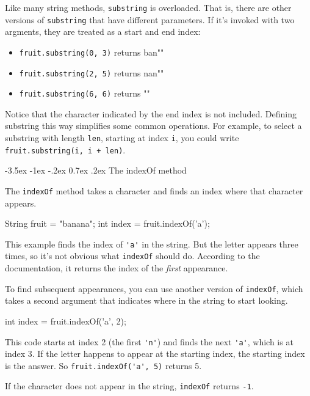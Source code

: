 \documentclass[12pt]{book}
\makeatletter
\theoremstyle{exercise}
\newcommand{\java}[1]{\verb"#1"}
\renewcommand{\section}{\@startsection{section}{1}{\z@}%
    {-3.5ex \@plus -1ex \@minus -.2ex}%
    {0.7ex \@plus.2ex}%
    {\normalfont\Large\bfseries}}
\newcommand{\java}[1]{\lstinline{#1}} %
\makeatother
\begin{document}
Like many string methods, \java{substring} is overloaded.
That is, there are other versions of \java{substring} that have different parameters.
If it's invoked with two argments, they are treated as a start and end index:

\begin{itemize}
\item \java{fruit.substring(0, 3)} returns \java{"ban"}
\item \java{fruit.substring(2, 5)} returns \java{"nan"}
\item \java{fruit.substring(6, 6)} returns \java{""}
\end{itemize}

Notice that the character indicated by the end index is not included.
Defining substring this way simplifies some common operations.
For example, to select a substring with length \java{len}, starting at index \java{i}, you could write \java{fruit.substring(i, i + len)}.


\section{The indexOf method}

The \java{indexOf} method takes a character and finds an index where that character appears.

\begin{code}
    String fruit = "banana";
    int index = fruit.indexOf('a');
\end{code}

This example finds the index of \java{'a'} in the string.
But the letter appears three times, so it's not obvious what \java{indexOf} should do.
According to the documentation, it returns the index of the {\em first} appearance.

To find subsequent appearances, you can use another version of \java{indexOf}, which takes a second argument that indicates where in the string to start looking.

\begin{code}
    int index = fruit.indexOf('a', 2);
\end{code}

This code starts at index 2 (the first \java{'n'}) and finds the next \java{'a'}, which is at index 3.
If the letter happens to appear at the starting index, the starting index is the answer.
So \java{fruit.indexOf('a', 5)} returns 5.

If the character does not appear in the string, \java{indexOf} returns \java{-1}.
\end{document}
